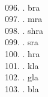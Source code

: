 \begin{tabbing}
\egroup  \\
096.	. 	\> bra 	\> \bgroup\tibetan \def\u#1{\vtop{\baselineskip0pt\hbox{#1}\hbox{\tibsp\char123}}}\parindent=0pt \newbox\fillerbox\setbox\fillerbox\hbox{\vrule height0.4cm depth0.4cm width0pt}\def\filler{\copy\fillerbox}\filler\tibsp{}\tenrm\ \tibetan
\egroup  \\
097.	. 	\> mra 	\> \bgroup\tibetan \def\u#1{\vtop{\baselineskip0pt\hbox{#1}\hbox{\tibsp\char123}}}\parindent=0pt \newbox\fillerbox\setbox\fillerbox\hbox{\vrule height0.4cm depth0.4cm width0pt}\def\filler{\copy\fillerbox}\filler\tibsp{}\tenrm\ \tibetan
\egroup  \\
098.	. 	\> shra 	\> \bgroup\tibetan \def\u#1{\vtop{\baselineskip0pt\hbox{#1}\hbox{\tibsp\char123}}}\parindent=0pt \newbox\fillerbox\setbox\fillerbox\hbox{\vrule height0.4cm depth0.4cm width0pt}\def\filler{\copy\fillerbox}\filler\tibsp{}\tenrm\ \tibetan
\egroup  \\
099.	. 	\> sra 	\> \bgroup\tibetan \def\u#1{\vtop{\baselineskip0pt\hbox{#1}\hbox{\tibsp\char123}}}\parindent=0pt \newbox\fillerbox\setbox\fillerbox\hbox{\vrule height0.4cm depth0.4cm width0pt}\def\filler{\copy\fillerbox}\filler\tibsp{}\tenrm\ \tibetan
\egroup  \\
100.	. 	\> hra 	\> \bgroup\tibetan \def\u#1{\vtop{\baselineskip0pt\hbox{#1}\hbox{\tibsp\char123}}}\parindent=0pt \newbox\fillerbox\setbox\fillerbox\hbox{\vrule height0.4cm depth0.4cm width0pt}\def\filler{\copy\fillerbox}\filler\tibsp{}\tenrm\ \tibetan
\egroup  \\
101.	. 	\> kla 	\> \bgroup\tibetan \def\u#1{\vtop{\baselineskip0pt\hbox{#1}\hbox{\tibsp\char123}}}\parindent=0pt \newbox\fillerbox\setbox\fillerbox\hbox{\vrule height0.4cm depth0.4cm width0pt}\def\filler{\copy\fillerbox}\filler\tibsp{}\tenrm\ \tibetan
\egroup  \\
102.	. 	\> gla 	\> \bgroup\tibetan \def\u#1{\vtop{\baselineskip0pt\hbox{#1}\hbox{\tibsp\char123}}}\parindent=0pt \newbox\fillerbox\setbox\fillerbox\hbox{\vrule height0.4cm depth0.4cm width0pt}\def\filler{\copy\fillerbox}\filler\tibsp{}\tenrm\ \tibetan
\egroup  \\
103.	. 	\> bla 	\> \bgroup\tibetan \def\u#1{\vtop{\baselineskip0pt\hbox{#1}\hbox{\tibsp\char123}}}\parindent=0pt \newbox\fillerbox\setbox\fillerbox\hbox{\vrule height0.4cm depth0.4cm width0pt}\def\filler{\copy\fillerbox}\filler\tibsp{}\tenrm\ \tibetan

\end{tabbing}
